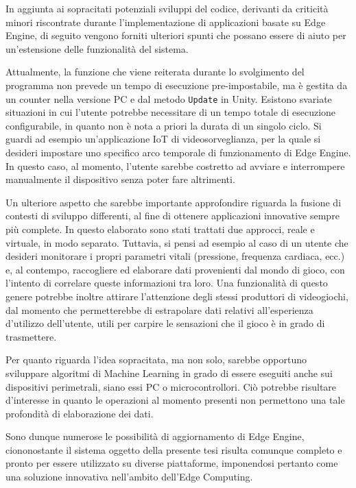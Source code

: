 In aggiunta ai sopracitati potenziali sviluppi del codice, derivanti da criticità minori riscontrate durante l’implementazione di applicazioni basate su Edge Engine, di seguito vengono forniti ulteriori spunti che possano essere di aiuto per un’estensione delle funzionalità del sistema.

Attualmente, la funzione che viene reiterata durante lo svolgimento del programma non prevede un tempo di esecuzione pre-impostabile, ma è gestita da un counter nella versione PC e dal metodo \texttt{Update} in Unity. Esistono svariate situazioni in cui l’utente potrebbe necessitare di un tempo totale di esecuzione configurabile, in quanto non è nota a priori la durata di un singolo ciclo. Si guardi ad esempio un’applicazione IoT di videosorveglianza, per la quale si desideri impostare uno specifico arco temporale di funzionamento di Edge Engine. In questo caso, al momento, l’utente sarebbe costretto ad avviare e interrompere manualmente il dispositivo senza poter fare altrimenti.

Un ulteriore aspetto che sarebbe importante approfondire riguarda la fusione di contesti di sviluppo differenti, al fine di ottenere applicazioni innovative sempre più complete. In questo elaborato sono stati trattati due approcci, reale e virtuale, in modo separato. Tuttavia, si pensi ad esempio al caso di un utente che desideri monitorare i propri parametri vitali (pressione, frequenza cardiaca, ecc.) e, al contempo, raccogliere ed elaborare dati provenienti dal mondo di gioco, con l’intento di correlare queste informazioni tra loro. Una funzionalità di questo genere potrebbe inoltre attirare l’attenzione degli stessi produttori di videogiochi, dal momento che permetterebbe di estrapolare dati relativi all'esperienza d’utilizzo dell'utente, utili per carpire le sensazioni che il gioco è in grado di trasmettere.

Per quanto riguarda l’idea sopracitata, ma non solo, sarebbe opportuno sviluppare algoritmi di Machine Learning in grado di essere eseguiti anche sui dispositivi perimetrali, siano essi PC o microcontrollori. Ciò potrebbe risultare d’interesse in quanto le operazioni al momento presenti non permettono una tale profondità di elaborazione dei dati.

Sono dunque numerose le possibilità di aggiornamento di Edge Engine, ciononostante il sistema oggetto della presente tesi risulta comunque completo e pronto per essere utilizzato su diverse piattaforme, imponendosi pertanto come una soluzione innovativa nell'ambito dell'Edge Computing.
